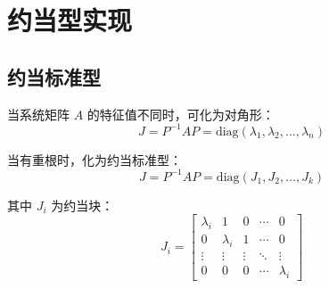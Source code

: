 \section{约当型实现}

\subsection{约当标准型}
当系统矩阵 $A$ 的特征值不同时，可化为对角形：
\[J = P^{-1}AP = \text{diag}(\lambda_1, \lambda_2, \ldots, \lambda_n)\]

当有重根时，化为约当标准型：
\[J = P^{-1}AP = \text{diag}(J_1, J_2, \ldots, J_k)\]

其中 $J_i$ 为约当块：
\[J_i = \begin{bmatrix}
\lambda_i & 1 & 0 & \cdots & 0 \\
0 & \lambda_i & 1 & \cdots & 0 \\
\vdots & \vdots & \vdots & \ddots & \vdots \\
0 & 0 & 0 & \cdots & \lambda_i
\end{bmatrix}\]
